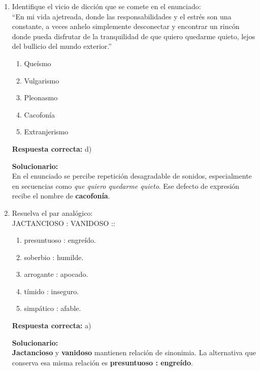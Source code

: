 \begin{enumerate}
	\vspace{2mm}
	\textbf{Solucionario:}\\
	En el contexto de la oración, \textbf{germen} significa inicio, principio o \textbf{origen}. Por ello, la respuesta correcta es \textbf{origen}.
	
	\vspace{6mm}
	
	\item Identifique el vicio de dicción que se comete en el enunciado:\\
	``En mi vida ajetreada, donde las responsabilidades y el estrés son una constante, a veces anhelo simplemente desconectar y encontrar un rincón donde pueda disfrutar de la tranquilidad de que quiero quedarme quieto, lejos del bullicio del mundo exterior.''
	\begin{enumerate}[label=\alph*)]
		\item Queísmo
		\item Vulgarismo
		\item Pleonasmo
		\item Cacofonía
		\item Extranjerismo
	\end{enumerate}
	\textbf{Respuesta correcta:} d)
	
	\vspace{2mm}
	\textbf{Solucionario:}\\
	En el enunciado se percibe repetición desagradable de sonidos, especialmente en secuencias como \textit{que quiero quedarme quieto}. Ese defecto de expresión recibe el nombre de \textbf{cacofonía}.
	
	\vspace{6mm}
	
	\item Resuelva el par analógico:\\
	JACTANCIOSO : VANIDOSO ::
	\begin{enumerate}[label=\alph*)]
		\item presuntuoso : engreído.
		\item soberbio : humilde.
		\item arrogante : apocado.
		\item tímido : inseguro.
		\item simpático : afable.
	\end{enumerate}
	\textbf{Respuesta correcta:} a)
	
	\vspace{2mm}
	\textbf{Solucionario:}\\
	\textbf{Jactancioso} y \textbf{vanidoso} mantienen relación de sinonimia. La alternativa que conserva esa misma relación es \textbf{presuntuoso : engreído}.
	

\end{enumerate}
